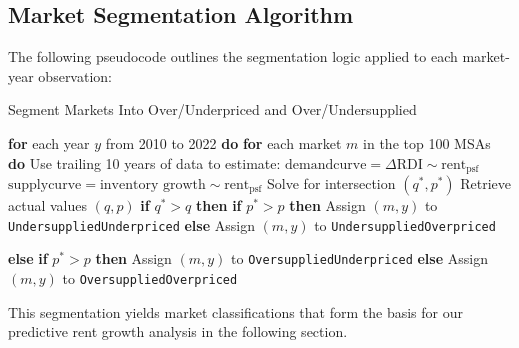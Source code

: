 \documentclass[sn-mathphys-num]{sn-jnl}%
\begin{document}
\subsection*{Market Segmentation Algorithm}

The following pseudocode outlines the segmentation logic applied to each market-year observation:

\newcommand{\For}[2]{\textbf{for} #1 \textbf{do} #2}
\newcommand{\If}[2]{\textbf{if} #1 \textbf{then} #2}
\newcommand{\Else}[1]{\textbf{else} #1}
\newcommand{\EndFor}{}
\newcommand{\EndIf}{}


	
	\begin{algorithm}[H]
		\caption*{Segment Markets Into Over/Underpriced and Over/Undersupplied}
		\begin{algorithmic}[1]
			\State \For{each year $y$ from 2010 to 2022}{
				\State \For{each market $m$ in the top 100 MSAs}{
					\State Use trailing 10 years of data to estimate:
					\State \hspace{1em} $\text{demandcurve} = \Delta \text{RDI} \sim \text{rent}_{\text{psf}}$
					\State \hspace{1em} $\text{supplycurve} = \text{inventory growth} \sim \text{rent}_{\text{psf}}$
					\State Solve for intersection $(q^*, p^*)$
					\State Retrieve actual values $(q, p)$
					\State \If{$q^* > q$}{
						\State \If{$p^* > p$}{
							\State Assign $(m, y)$ to \texttt{UndersuppliedUnderpriced}
						}\Else{
							\State Assign $(m, y)$ to \texttt{UndersuppliedOverpriced}
						}\EndIf
					}\Else{
						\State \If{$p^* > p$}{
							\State Assign $(m, y)$ to \texttt{OversuppliedUnderpriced}
						}\Else{
							\State Assign $(m, y)$ to \texttt{OversuppliedOverpriced}
						}\EndIf
					}\EndIf
				}\EndFor
			}\EndFor
		\end{algorithmic}
	\end{algorithm}
This segmentation yields market classifications that form the basis for our predictive rent growth analysis in the following section.
\end{document}
